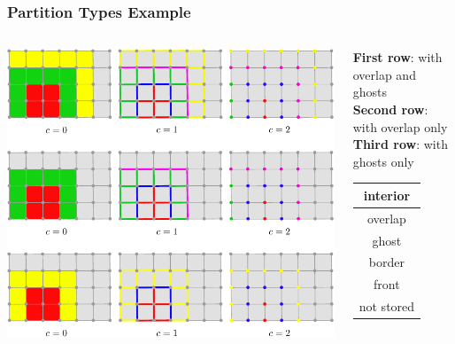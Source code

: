 \documentclass[aspectratio=169,11pt]{beamer}
\theoremstyle{definition}
\begin{document}
\begin{frame}[fragile]
\frametitle{Partition Types Example}
\begin{columns}[c]
\begin{column}{0.75\textwidth}

\includegraphics[width=\textwidth]{partitionsingle}
\end{column}
\begin{column}{0.25\textwidth}
\vskip0.5cm
\textbf{First row}: with overlap and ghosts\\
\textbf{Second row}: with overlap only\\
\textbf{Third row}: with ghosts only
\vskip5mm
\begin{center}
\begin{tabular}{|c|}
\hline\color{red} interior\\\hline
\color{green} overlap\\\hline
\color{yellow} ghost\\\hline
\color{blue} border\\\hline
\color{magenta} front\\\hline
\color{gray} not stored\\\hline
\end{tabular}
\end{center}
\end{column}
\end{columns}

\end{frame}
\end{document}
